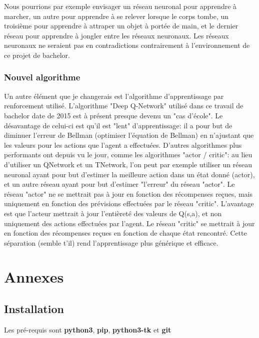 \documentclass[11pt,a4paper]{report}
\begin{document}
   \par Nous pourrions par exemple envisager un réseau neuronal pour apprendre à marcher, un autre pour apprendre à se relever lorsque le corps tombe, un troisième pour apprendre à attraper un objet à portée de main, et le dernier réseau pour apprendre à jongler entre les réseaux neuronaux. Les réseaux neuronaux ne seraient pas en contradictions contrairement à l'environnement de ce projet de bachelor. 
   
  \subsection{Nouvel algorithme}
  
  \par Un autre élément que je changerais est l'algorithme d'apprentissage par renforcement utilisé. L'algorithme "Deep Q-Network" utilisé dans ce travail de bachelor date de 2015 est à présent presque devenu un "cas d'école". Le désavantage de celui-ci est qu'il est "lent" d'apprentissage: il a pour but de diminuer l'erreur de Bellman (optimiser l'équation de Bellman) en n'ajustant que les valeurs pour les actions que l'agent a effectuées. D'autres algorithmes plus performants ont depuis vu le jour, comme les algorithmes "actor / critic": au lieu d'utiliser un QNetwork et un TNetwork, l'on peut par exemple utiliser un réseau neuronal ayant pour but d'estimer la meilleure action dans un état donné (actor), et un autre réseau ayant pour but d'estimer "l'erreur" du réseau "actor". Le réseau "actor" ne se mettrait pas à jour en fonction des récompenses reçues, mais uniquement en fonction des prévisions effectuées par le réseau "critic". L'avantage est que l'acteur mettrait à jour l’entièreté des valeurs de Q(s,a), et non uniquement des actions effectuées par l'agent. Le réseau "critic" se mettrait à jour en fonction des récompenses reçues en fonction de chaque état rencontré. Cette séparation (semble t'il) rend l'apprentissage plus générique et efficace. 
  
  \chapter{Annexes}
  
  \section{Installation}
  
  \par Les pré-requis sont \textbf{python3}, \textbf{pip}, \textbf{python3-tk} et \textbf{git}
  
\end{document}
